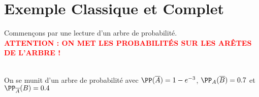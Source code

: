 \documentclass[12pt,fleqn]{report} %
\begin{document}
\section{Exemple Classique et Complet}
Commençons par une lecture d'un arbre de probabilité.\\

\textcolor{red}{\textbf{ATTENTION : ON MET LES PROBABILIT\'ES SUR LES AR\^ETES DE L'ARBRE !}}



\begin{example}\label{Exemple Proba Conditionnelle}\text{ }\\
	On se munit d'un arbre de probabilité avec $\PP(\overline{A})= 1 - e^{-3}$, $\PP_{A}(\overline{B}) = 0.7$ et $\PP_{\overline{A}}(B) = 0.4$
	
	
	
	

\end{example}
\end{document}
